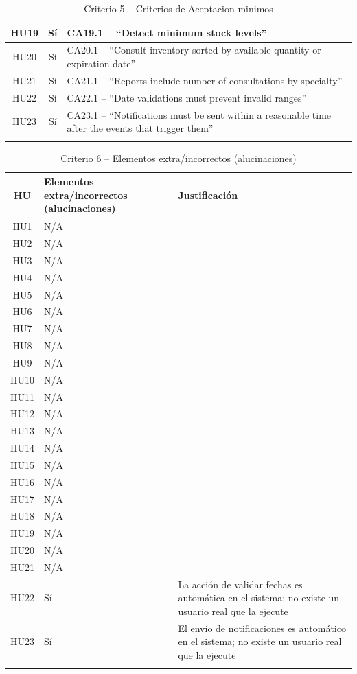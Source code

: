 \begin{longtable}{|c|c|p{6cm}|}
\hline
HU19 & Sí & CA19.1 – “Detect minimum stock levels” \\
\hline
HU20 & Sí & CA20.1 – “Consult inventory sorted by available quantity or expiration date” \\
\hline
HU21 & Sí & CA21.1 – “Reports include number of consultations by specialty” \\
\hline
HU22 & Sí & CA22.1 – “Date validations must prevent invalid ranges” \\
\hline
HU23 & Sí & CA23.1 – “Notifications must be sent within a reasonable time after the events that trigger them” \\
\hline
\caption{Criterio 5 – Criterios de Aceptacion minimos}
\end{longtable}

\begin{longtable}{|c|p{5cm}|p{6cm}|}
\hline
\textbf{HU} & \textbf{Elementos extra/incorrectos (alucinaciones)} & \textbf{Justificación} \\
\hline
HU1 & N/A &   \\
\hline
HU2 & N/A &  \\
\hline
HU3 & N/A &  \\
\hline
HU4 & N/A & \\
\hline
HU5 & N/A & \\
\hline
HU6 & N/A & \\
\hline
HU7 & N/A & \\
\hline
HU8 & N/A & \\
\hline
HU9 & N/A & \\
\hline
HU10 & N/A & \\
\hline
HU11 & N/A & \\
\hline
HU12 & N/A & \\
\hline
HU13 & N/A &  \\
\hline
HU14 & N/A &  \\
\hline
HU15 & N/A & \\
\hline
HU16 & N/A & \\
\hline
HU17 & N/A &  \\
\hline
HU18 & N/A &  \\
\hline
HU19 & N/A &  \\
\hline
HU20 & N/A &  \\
\hline
HU21 & N/A &  \\
\hline
HU22 & Sí & La acción de validar fechas es automática en el sistema; no existe un usuario real que la ejecute \\
\hline
HU23 & Sí & El envío de notificaciones es automático en el sistema; no existe un usuario real que la ejecute \\
\hline
\caption{Criterio 6 – Elementos extra/incorrectos (alucinaciones)}
\end{longtable}

